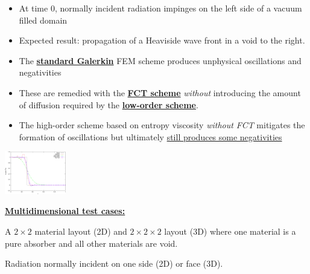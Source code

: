 \begin{itemize}
\item At time 0, normally incident radiation impinges on the left side of a vacuum filled domain
\item Expected result: propagation of a Heaviside wave front in a void to the right. 
\item The \underline{\bf standard Galerkin} FEM scheme produces unphysical oscillations and negativities
\item These are remedied with the \underline{\bf FCT scheme} {\it without}
introducing the amount of diffusion required by the \underline{\bf low-order scheme}. 
\item The high-order scheme based on entropy viscosity {\it without FCT} mitigates the formation of
oscillations but ultimately \underline{still produces some negativities}
\end{itemize}

\includegraphics[width=0.20\textwidth]{figures/solutions_3_SSPRK33.pdf}

\bigskip

\underline{\bf Multidimensional test cases:} 

A $2 \times 2$ material layout (2D) and $2 \times 2 \times 2$ layout (3D)
where one material is a pure absorber and all other materials are void.


Radiation normally incident on one side (2D) or face (3D).
\medskip

\vspace{\baselineskip}

